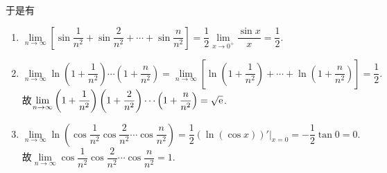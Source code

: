 \documentclass[UTF8,a4paper,20pt]{article}
\begin{document}
\begin{enumerate}
\begin{equation*}
\end{equation*}
于是有
	\begin{enumerate}[(1)]
	\item $\lim\limits_{n\to\infty}\left[\sin{\dfrac{1}{n^2}}+\sin{\dfrac{2}{n^2}}+\cdots+\sin{\dfrac{n}{n^2}}\right]=\dfrac{1}{2}\lim\limits_{x\to0^{+}}\dfrac{\sin{x}}{x}=\dfrac{1}{2}.$
	\item $\lim\limits_{n\to\infty}\ln\left(1+\dfrac{1}{n^2}\right)\cdots\left(1+\dfrac{n}{n^2}\right)=\lim\limits_{n\to\infty}\left[\ln\left(1+\dfrac{1}{n^2}\right)+\cdots+\ln\left(1+\dfrac{n}{n^2}\right)\right]=\dfrac{1}{2}.$\\
故$\lim\limits_{n\to\infty}\left(1+\dfrac{1}{n^2}\right)\left(1+\dfrac{2}{n^2}\right)\cdots\left(1+\dfrac{n}{n^2}\right)=\sqrt{\mathrm{e}}$.
	\item $\lim\limits_{n\to\infty}\ln\left(\cos{\dfrac{1}{n^2}}\cos{\dfrac{2}{n^2}}\cdots\cos{\dfrac{n}{n^2}}\right)=\dfrac{1}{2}(\ln(\cos x))'|_{x=0}=-\dfrac{1}{2}\tan{0}=0.$\\
故$\lim\limits_{n\to\infty}\cos{\dfrac{1}{n^2}}\cos{\dfrac{2}{n^2}}\cdots\cos{\dfrac{n}{n^2}}=1$.
	\end{enumerate}
\end{enumerate}

\clearpage
\end{document}
